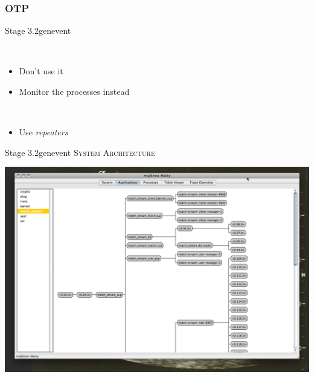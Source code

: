 \documentclass[utf8]{beamer}
\begin{document}
\subsubsection{OTP}
\begin{frame}{Stage 3.2}{gen\textunderscore event}
	\begin{description}
		\item<+->[sup\textunderscore handler]\ \\
			\begin{itemize}
				\item Don't use it
				\item Monitor the processes instead
			\end{itemize}
		\item<+->[Long Delivery Queues]\ \\
			\begin{itemize}
				\item Use \emph{repeaters}
			\end{itemize}
	\end{description}
\end{frame}
\begin{frame}{Stage 3.2}{gen\textunderscore event}
	\textsc{System Architecture}
	\begin{center}
		\includegraphics[height=.75\textheight]{img/running-late.png}
	\end{center}
\end{frame}
\end{document}
